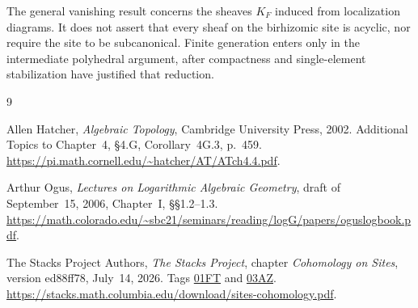 \documentclass[11pt]{article}
\theoremstyle{definition}
\theoremstyle{remark}
\begin{document}
The general vanishing result concerns the sheaves $K_F$ induced from localization diagrams. It does not assert that every sheaf on the birhizomic site is acyclic, nor require the site to be subcanonical. Finite generation enters only in the intermediate polyhedral argument, after compactness and single-element stabilization have justified that reduction.

\begin{thebibliography}{9}
\raggedright
{}
Allen Hatcher, \emph{Algebraic Topology}, Cambridge University Press, 2002. Additional Topics to Chapter~4, \S4.G, Corollary~4G.3, p.~459.
\url{https://pi.math.cornell.edu/~hatcher/AT/ATch4.4.pdf}.

Arthur Ogus, \emph{Lectures on Logarithmic Algebraic Geometry}, draft of September~15, 2006, Chapter~I, \S\S1.2--1.3.
\url{https://math.colorado.edu/~sbc21/seminars/reading/logG/papers/oguslogbook.pdf}.

The Stacks Project Authors, \emph{The Stacks Project}, chapter \emph{Cohomology on Sites}, version ed88ff78, July~14, 2026. Tags
\href{https://stacks.math.columbia.edu/tag/01FT}{01FT} and
\href{https://stacks.math.columbia.edu/tag/03AZ}{03AZ}.
\url{https://stacks.math.columbia.edu/download/sites-cohomology.pdf}.
\end{thebibliography}
\end{document}

